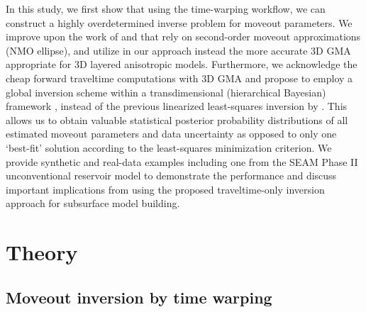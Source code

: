 In this study, we first show that using the time-warping workflow, we can construct a highly overdetermined inverse problem for moveout parameters. We improve upon the work of \cite{will} and \cite{willthesis} that rely on second-order moveout approximations (NMO ellipse), and utilize in our approach instead the more accurate 3D GMA appropriate for 3D layered anisotropic models. Furthermore, we acknowledge the cheap forward traveltime computations with 3D GMA and propose to employ a global inversion scheme within a transdimensional (hierarchical Bayesian) framework \cite[]{malinverno,sambridgetrans1,sambridgetrans2}, instead of the previous linearized least-squares inversion by \cite{willthesis}. This allows us to obtain valuable statistical posterior probability distributions of all estimated moveout parameters and data uncertainty as opposed to only one `best-fit' solution according to the least-squares minimization criterion. We provide synthetic and real-data examples including one from the SEAM Phase II unconventional reservoir model to demonstrate the performance and discuss important implications from using the proposed traveltime-only inversion approach for subsurface model building.


\section{Theory}

\subsection{Moveout inversion by time warping}
 
